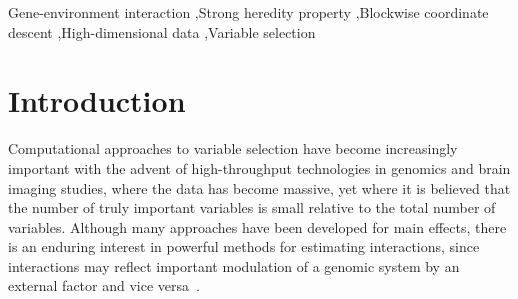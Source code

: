 \documentclass[a4paper,fleqn]{cas-sc}
\begin{document}


\begin{keywords}
Gene-environment interaction \sep Strong heredity property \sep Blockwise coordinate descent \sep High-dimensional data \sep Variable selection
\end{keywords}


\maketitle

\section{Introduction}

Computational approaches to variable selection have become increasingly important with the advent of high-throughput technologies in genomics and brain imaging studies, where the data has become massive, yet where it is believed that the number of truly important variables is small relative to the total number of variables.
Although many approaches have been developed for main effects, there is an enduring interest in powerful methods for estimating interactions, since interactions may reflect important modulation of a genomic system by an external factor and vice versa~\citep{bhatnagar2018analytic}.
\end{document}
